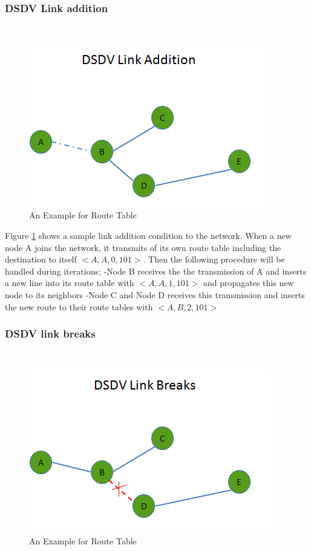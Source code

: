 \subsubsection{DSDV Link addition}\hspace{0pt} \\
\begin{figure}[H]
\caption{An Example for Route Table} \label{linkk_addition}
\centering
\includegraphics[scale = 0.65]{link_add}
\end{figure}	

Figure \ref{linkk_addition} shows a sample link addition condition to the network. When a new node A joins the network, it transmits of its own route table including the destination to itself $<A,A,0,101>$. Then the following procedure will be handled during iterations; \newline
	-Node B receives the the transmission of A and inserts a new line into its route table with $<A,A,1,101>$ and propagates this new node to its neighbors \newline
	-Node C and Node D receives this transmission and inserts the new route to their route tables with $<A,B,2,101>$
		
\subsubsection{DSDV link breaks}\hspace{0pt} \\
	
\begin{figure}[H]
\caption{An Example for Route Table} \label{linkk_brake}
\centering
\includegraphics[scale = 0.65]{link_break}
\end{figure}

